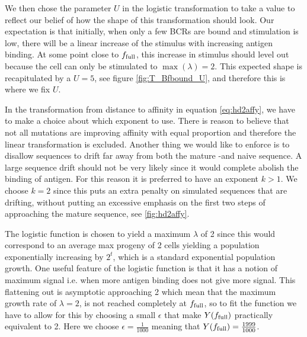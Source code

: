We then chose the parameter $U$ in the logistic transformation to take a value to reflect our belief of how the shape of this transformation should look.
Our expectation is that initially, when only a few BCRs are bound and stimulation is low, there will be a linear increase of the stimulus with increasing antigen binding.
At some point close to $f_{\text{full}}$, this increase in stimulus should level out because the cell can only be stimulated to $\operatorname{max}(\lambda)=2$.
This expected shape is recapitulated by a $U=5$, see figure \ref{fig:T_Bfbound_U}, and therefore this is where we fix $U$.

In the transformation from distance to affinity in equation \ref{eq:hd2affy}, we have to make a choice about which exponent to use.
There is reason to believe that not all mutations are improving affinity with equal proportion and therefore the linear transformation is excluded.
Another thing we would like to enforce is to disallow sequences to drift far away from both the mature -and naive sequence.
A large sequence drift should not be very likely since it would complete abolish the binding of antigen.
For this reason it is preferred to have an exponent $k>1$.
We choose $k=2$ since this puts an extra penalty on simulated sequences that are drifting, without putting an excessive emphasis on the first two steps of approaching the mature sequence, see \ref{fig:hd2affy}.

The logistic function is chosen to yield a maximum $\lambda$ of 2 since this would correspond to an average max progeny of 2 cells yielding a population exponentially increasing by $2^t$, which is a standard exponential population growth.
One useful feature of the logistic function is that it has a notion of maximum signal i.e. when more antigen binding does not give more signal.
This flattening out is asymptotic approaching 2 which mean that the maximum growth rate of $\lambda=2$, is not reached completely at $f_{\text{full}}$, so to fit the function we have to allow for this by choosing a small $\epsilon$ that make $Y(f_{\text{full}})$ practically equivalent to 2.
Here we choose $\epsilon=\frac{1}{1000}$ meaning that $Y(f_{\text{full}}) = \frac{1999}{1000}$.

